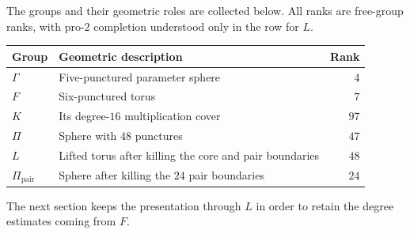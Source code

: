 The groups and their geometric roles are collected below. All ranks are
free-group ranks, with pro-$2$ completion understood only in the row
for $L$.
\begin{center}
\begin{tabular}{@{}llr@{}}
Group & Geometric description & Rank \\
\hline
$\Gamma$ & Five-punctured parameter sphere & $4$ \\
$F$ & Six-punctured torus & $7$ \\
$K$ & Its degree-$16$ multiplication cover & $97$ \\
$\Pi$ & Sphere with $48$ punctures & $47$ \\
$L$ & Lifted torus after killing the core and pair boundaries & $48$ \\
$\Pi_{\mathrm{pair}}$ & Sphere after killing the $24$ pair boundaries & $24$
\end{tabular}
\end{center}
The next section keeps the presentation through $L$ in order to retain
the degree estimates coming from $F$.
